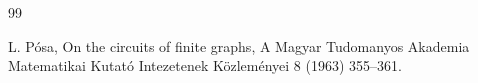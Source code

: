 \documentclass[11pt]{article}
\newcommand{\2}{\vspace{0.2cm}}
\begin{document}
\begin{thebibliography}{99}
{ L. P{\'o}sa, On the circuits of finite graphs, A Magyar Tudomanyos Akademia Matematikai Kutat{\'o} Intezetenek K{\"o}zlem{\'e}nyei 8 (1963) 355--361.




}


\end{thebibliography}
\end{document}
